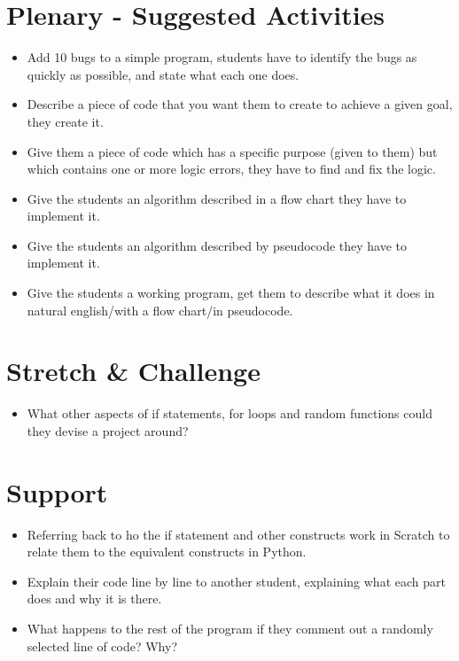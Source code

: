 \documentclass{geocraft-lesson-plan}
\begin{document}
\section*{Plenary - Suggested Activities}
\begin{itemize}
\item Add 10 bugs to a simple program, students have to identify the bugs as quickly as possible, and state what each
  one does.
\item Describe a piece of code that you want them to create to achieve a given goal, they create it.
\item Give them a piece of code which has a specific purpose (given to them) but which contains one or more logic
  errors, they have to find and fix the logic.
\item Give the students an algorithm described in a flow chart they have to implement it.
\item Give the students an algorithm described by pseudocode they have to implement it.
\item Give the students a working program, get them to describe what it does in natural english/with a flow chart/in
  pseudocode.
\end{itemize}


\section*{Stretch \& Challenge}
\begin{itemize}
\item What other aspects of if statements, for loops and random functions could they devise a project around?
\end{itemize}

\section*{Support}
\begin{itemize}
\item Referring back to ho the if statement and other constructs work in Scratch to relate them to the equivalent
  constructs in Python.
\item Explain their code line by line to another student, explaining what each part does and why it is there.
\item What happens to the rest of the program if they comment out a randomly selected line of code? Why?
\end{itemize}
\end{document}
